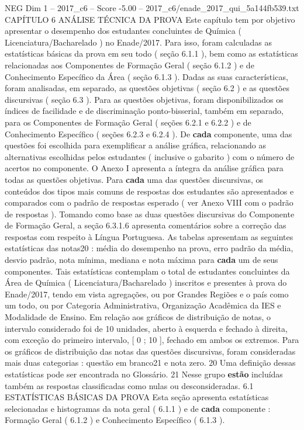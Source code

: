 \begin{textsample}{NEG Dim 1 – 2017\_c6 – Score -5.00 – 2017\_c6/enade\_2017\_qui\_5a144fb539.txt}  \label{ex:f1_neg_144}
CAPÍTULO 6 ANÁLISE TÉCNICA DA PROVA Este capítulo tem por objetivo apresentar o desempenho dos estudantes concluintes de Química ( Licenciatura/Bacharelado ) no Enade/2017.
Para isso, foram calculadas as estatísticas básicas da prova em seu todo ( seção 6.1.1 ), bem como as estatísticas relacionadas aos Componentes de Formação Geral ( seção 6.1.2 ) e de Conhecimento Específico da Área ( seção 6.1.3 ).
Dadas as suas características, foram analisadas, em separado, as questões objetivas ( seção 6.2 ) e as questões discursivas ( seção 6.3 ).
Para as questões objetivas, foram disponibilizados os índices de facilidade e de discriminação ponto-bisserial, também em separado, para os Componentes de Formação Geral ( seções 6.2.1 e 6.2.2 ) e de Conhecimento Específico ( seções 6.2.3 e 6.2.4 ).
De \textbf{cada} componente, uma das questões foi escolhida para exemplificar a análise gráfica, relacionando as alternativas escolhidas pelos estudantes ( inclusive o gabarito ) com o número de acertos no componente.
O Anexo I apresenta a íntegra da análise gráfica para todas as questões objetivas.
Para \textbf{cada} uma das questões discursivas, os conteúdos dos tipos mais comuns de respostas dos estudantes são apresentados e comparados com o padrão de respostas esperado ( ver Anexo VIII com o padrão de respostas ).
Tomando como base as duas questões discursivas do Componente de Formação Geral, a seção 6.3.1.6 apresenta comentários sobre a correção das respostas com respeito à Língua Portuguesa.
As tabelas apresentam as seguintes estatísticas das notas20 : média do desempenho na prova, erro padrão da média, desvio padrão, nota mínima, mediana e nota máxima para \textbf{cada} um de seus componentes.
Tais estatísticas contemplam o total de estudantes concluintes da Área de Química ( Licenciatura/Bacharelado ) inscritos e presentes à prova do Enade/2017, tendo em vista agregações, ou por Grandes Regiões e o país como um todo, ou por Categoria Administrativa, Organização Acadêmica da IES e Modalidade de Ensino.
Em relação aos gráficos de distribuição de notas, o intervalo considerado foi de 10 unidades, aberto à esquerda e fechado à direita, com exceção do primeiro intervalo, [ 0 ; 10 ], fechado em ambos os extremos.
Para os gráficos de distribuição das notas das questões discursivas, foram consideradas mais duas categorias : questão em branco21 e nota zero. 20 Uma definição dessas estatísticas pode ser encontrada no Glossário. 21 Nesse grupo \textbf{estão} incluídas também as respostas classificadas como nulas ou desconsideradas. 6.1 ESTATÍSTICAS BÁSICAS DA PROVA Esta seção apresenta estatísticas selecionadas e histogramas da nota geral ( 6.1.1 ) e de \textbf{cada} componente : Formação Geral ( 6.1.2 ) e Conhecimento Específico ( 6.1.3 ).

\end{textsample}
